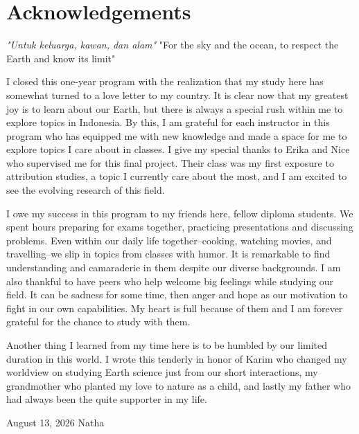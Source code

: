 \chapter*{Acknowledgements}

\textit{"Untuk keluarga, kawan, dan alam"} \newline
"For the sky and the ocean, to respect the Earth and know its limit" \newline

I closed this one-year program with the realization that my study here has somewhat turned to a love letter to my country. It is clear now that my greatest joy is to learn about our Earth, but there is always a special rush within me to explore topics in Indonesia. By this, I am grateful for each instructor in this program who has equipped me with new knowledge and made a space for me to explore topics I care about in classes. I give my special thanks to Erika and Nice who supervised me for this final project. Their class was my first exposure to attribution studies, a topic I currently care about the most, and I am excited to see the evolving research of this field.

I owe my success in this program to my friends here, fellow diploma students. We spent hours preparing for exams together, practicing presentations and discussing problems. Even within our daily life together--cooking, watching movies, and travelling--we slip in topics from classes with humor. It is remarkable to find understanding and camaraderie in them despite our diverse backgrounds. I am also thankful to have peers who help welcome big feelings while studying our field. It can be sadness for some time, then anger and hope as our motivation to fight in our own capabilities. My heart is full because of them and I am forever grateful for the chance to study with them.

Another thing I learned from my time here is to be humbled by our limited duration in this world. I wrote this tenderly in honor of Karim who changed my worldview on studying Earth science just from our short interactions, my grandmother who planted my love to nature as a child, and lastly my father who had always been the quite supporter in my life. \newline

August 13, 2026 \newline
Natha



